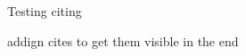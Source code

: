 Testing citing ~\cite{4799375}

addign cites to get them visible in the end
~\cite{5464831}
~\cite{5583037}
~\cite{5583094}
~\cite{5710601}
~\cite{5739529}
~\cite{6081486}
~\cite{6116319}
~\cite{6411890}
~\cite{6467556}
~\cite{6625056}
~\cite{6705673}
~\cite{5605523}
~\cite{5290984}
~\cite{1203346}
~\cite{4803123}
~\cite{4799318}
~\cite{5381595}
~\cite{6229729}
~\cite{4347144}




